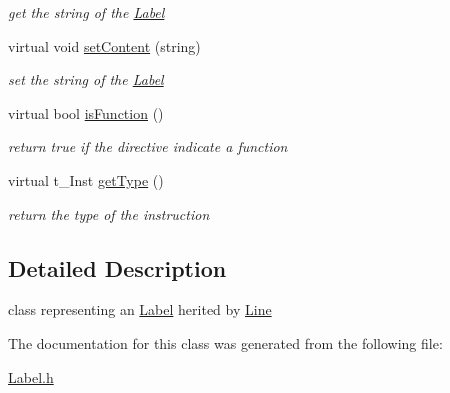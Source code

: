 \begin{DoxyCompactItemize}
\begin{DoxyCompactList}\small\item\em get the string of the \hyperlink{classLabel}{Label} \item\end{DoxyCompactList}\item 
\hypertarget{classLabel_a80c83b9767d0b3116d603c79973ffb6b}{
virtual void \hyperlink{classLabel_a80c83b9767d0b3116d603c79973ffb6b}{setContent} (string)}
\label{classLabel_a80c83b9767d0b3116d603c79973ffb6b}

\begin{DoxyCompactList}\small\item\em set the string of the \hyperlink{classLabel}{Label} \item\end{DoxyCompactList}\item 
\hypertarget{classLabel_a891d14c5e6d110964ba55a3ecddc0999}{
virtual bool \hyperlink{classLabel_a891d14c5e6d110964ba55a3ecddc0999}{isFunction} ()}
\label{classLabel_a891d14c5e6d110964ba55a3ecddc0999}

\begin{DoxyCompactList}\small\item\em return true if the directive indicate a function \item\end{DoxyCompactList}\item 
\hypertarget{classLabel_ae988d31522bce75a19fabca6e4aaedc9}{
virtual t\_\-Inst \hyperlink{classLabel_ae988d31522bce75a19fabca6e4aaedc9}{getType} ()}
\label{classLabel_ae988d31522bce75a19fabca6e4aaedc9}

\begin{DoxyCompactList}\small\item\em return the type of the instruction \item\end{DoxyCompactList}\end{DoxyCompactItemize}


\subsection{Detailed Description}
class representing an \hyperlink{classLabel}{Label} herited by \hyperlink{classLine}{Line} 

The documentation for this class was generated from the following file:\begin{DoxyCompactItemize}
\item 
\hyperlink{Label_8h}{Label.h}\end{DoxyCompactItemize}
